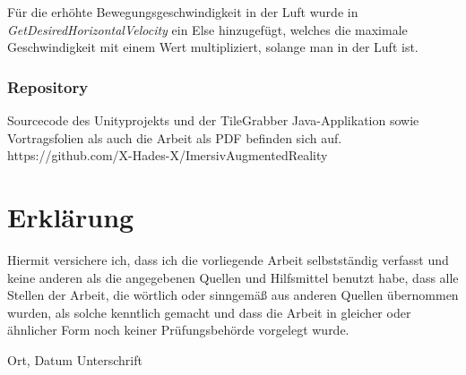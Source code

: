 \newpage
Für die erhöhte Bewegungsgeschwindigkeit in der Luft wurde in \textit{GetDesiredHorizontalVelocity} ein Else hinzugefügt, welches die maximale Geschwindigkeit mit einem Wert multipliziert, solange man in der Luft ist.

\renewcommand{\baselinestretch}{1}\normalsize

\renewcommand{\baselinestretch}{1.5}\normalsize




\subsection*{Repository}
Sourcecode des Unityprojekts und der TileGrabber Java-Applikation sowie Vortragsfolien als auch die Arbeit als PDF befinden sich auf.\\[6pt]
https://github.com/X-Hades-X/ImersivAugmentedReality

\chapter*{Erklärung}
\vspace{-20pt}
Hiermit versichere ich, dass ich die vorliegende Arbeit selbstständig verfasst und keine anderen als die angegebenen Quellen und Hilfsmittel benutzt habe, dass alle Stellen der Arbeit, die wörtlich oder sinngemäß aus anderen Quellen übernommen wurden, als solche kenntlich gemacht und dass die Arbeit in gleicher oder ähnlicher Form noch keiner Prüfungsbehörde vorgelegt wurde.

\vspace{3cm}
Ort, Datum \hspace{5cm} Unterschrift\\

